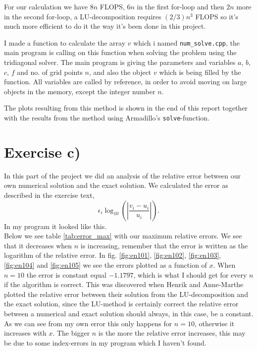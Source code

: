 \documentclass[english, 11pt]{article}
\begin{document}
For our calculation we have $8n$ FLOPS, $6n$ in the first for-loop and then $2n$ more in the second for-loop, a LU-decomposition requires $(2/3)n^3$ FLOPS so it's much more efficient to do it the way it's been done in this project.

I made a function to calculate the array $v$ which i named \verb|num_solve.cpp|, the main program is calling on this function when solving the problem using the tridiagonal solver. The main program is giving the parameters and variables $a$, $b$, $c$, $f$ and no. of grid points $n$, and also the object $v$ which is being filled by the function. All variables are called by reference, in order to avoid moving on large objects in the memory, except the integer number $n$.



The plots resulting from this method is shown in the end of this report together with the results from the method using Armadillo's \verb|solve|-function.

\section*{Exercise c)} In this part of the project we did an analysis of the relative error between our own numerical solution and the exact solution. We calculated the error as described in the exercise text,
$$ \epsilon_i \log_{10} \left( \left| \frac{v_i - u_i}{u_i} \right|  \right). $$
In my program it looked like this.\\



Below we see table \ref{tab:error_max} with our maximum relative errors. We see that it decreases when $n$ is increasing, remember that the error is written as the logarithm of the relative error. In fig. \ref{fig:en101}, \ref{fig:en102}, \ref{fig:en103}, \ref{fig:en104} and \ref{fig:en105} we see the errors plotted as a function of $x$. When $n=10$ the error is constant equal $-1.1797$, which is what I should get for every $n$ if the algorithm is correct. This was discovered when Henrik and Anne-Marthe plotted the relative error between their solution from the LU-decomposition and the exact solution, since the LU-method is certainly correct the relative error between a numerical and exact solution should always, in this case, be a constant. As we can see from my own error this only happens for $n=10$, otherwise it increases with $x$. The bigger $n$ is the more the relative error increases, this may be due to some index-errors in my program which I haven't found.
\end{document}
